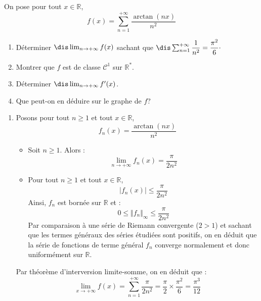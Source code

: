 \documentclass[a4paper,10pt]{report}
\begin{document}
\begin{Exercice}{} On pose pour tout $x \in \mathbb{R}$,
$$ f(x) = \sum_{n=1}^{+ \infty} \dfrac{\arctan(nx)}{n^2}$$
\begin{enumerate}
\item Déterminer $\dis \lim_{n \rightarrow + \infty} f(x)$ sachant que $\dis \sum_{n=1}^{+ \infty} \dfrac{1}{n^2} = \dfrac{\pi^2}{6} \cdot$
\item Montrer que $f$ est de classe $\mathcal{C}^1$ sur $\mathbb{R}^*$.
\item Déterminer $\dis \lim_{n \rightarrow + \infty} f'(x)$.
\item Que peut-on en déduire sur le graphe de $f$?
\end{enumerate}
\end{Exercice}

\corr \begin{enumerate}
\item Posons pour tout $n \geq 1$ et tout $x \in \mathbb{R}$,
$$ f_n(x) =  \dfrac{\arctan(nx)}{n^2}$$
\begin{itemize}
\item Soit $n \geq 1$. Alors :
$$ \lim_{n \rightarrow + \infty} f_n(x) = \dfrac{\pi}{2 n^2} $$
\item Pour tout $n \geq 1$ et tout $x \in \mathbb{R}$,
$$ \vert f_n(x) \vert \leq \dfrac{\pi}{2n^2}$$
Ainsi, $f_n$ est bornée sur $\mathbb{R}$ et :
$$ 0 \leq \Vert f_n \Vert_{ \infty} \leq \dfrac{\pi}{2n^2}$$
Par comparaison à une série de Riemann convergente ($2>1$) et sachant que les termes généraux des séries étudiées sont positifs, on en déduit que la série de fonctions de terme général $f_n$ converge normalement et donc uniformément sur $\mathbb{R}$.
\end{itemize}
Par théorème d'interversion limite-somme, on en déduit que :
$$ \lim_{x \rightarrow + \infty} f(x) = \sum_{n=1}^{+ \infty} \dfrac{\pi}{2n^2} = \dfrac{\pi}{2} \times \dfrac{\pi^2}{6} = \dfrac{\pi^3}{12}$$


\end{enumerate}
\end{document}
